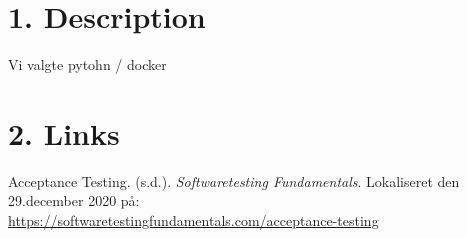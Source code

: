 \documentclass[10pt]{report}
\begin{document}
\chapter*{1. Description}
\pagestyle{fancy}
Vi valgte pytohn / docker



\chapter*{2. Links}
\pagestyle{fancy}
\noindent Acceptance Testing. (s.d.). \textit{Softwaretesting Fundamentals}. Lokaliseret den 29.december 2020 på:\\
\href{https://softwaretestingfundamentals.com/acceptance-testing}{https://softwaretestingfundamentals.com/acceptance-testing}
\end{document}
